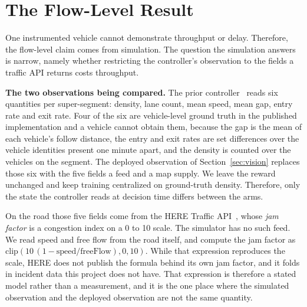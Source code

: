 \section{The Flow-Level Result}
\label{sec:simulation}


One instrumented vehicle cannot demonstrate throughput or delay. Therefore, the flow-level claim comes from simulation. The question the simulation answers is narrow, namely whether restricting the controller's observation to the fields a traffic API returns costs throughput.


\noindent\textbf{The two observations being compared.} The prior controller~\cite{self_regulating_cars} reads six quantities per super-segment: density, lane count, mean speed, mean gap, entry rate and exit rate. Four of the six are vehicle-level ground truth in the published implementation and a vehicle cannot obtain them, because the gap is the mean of each vehicle's follow distance, the entry and exit rates are set differences over the vehicle identities present one minute apart, and the density is counted over the vehicles on the segment. The deployed observation of Section~\ref{sec:vision} replaces those six with the five fields a feed and a map supply. We leave the reward unchanged and keep training centralized on ground-truth density. Therefore, only the state the controller reads at decision time differs between the arms.

On the road those five fields come from the HERE Traffic API~\cite{here_traffic_api}, whose \emph{jam factor} is a congestion index on a 0 to 10 scale. The simulator has no such feed. We read speed and free flow from the road itself, and compute the jam factor as $\mathrm{clip}(10\,(1 - \mathrm{speed}/\mathrm{freeFlow}), 0, 10)$. While that expression reproduces the scale, HERE does not publish the formula behind its own jam factor, and it folds in incident data this project does not have. That expression is therefore a stated model rather than a measurement, and it is the one place where the simulated observation and the deployed observation are not the same quantity.

